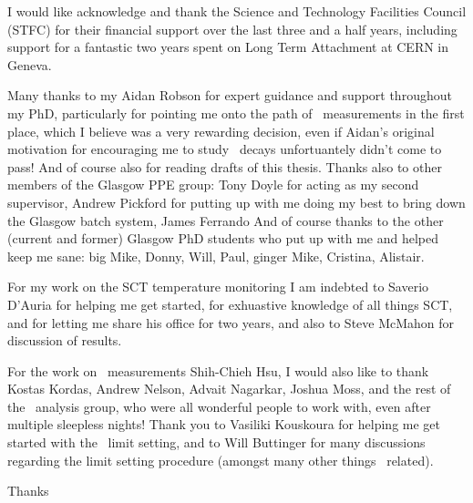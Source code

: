 I would like acknowledge and thank the Science and Technology Facilities Council
(STFC) for their financial support over the last three and a half years,
including support for a fantastic two years spent on Long Term Attachment at CERN
in Geneva.

Many thanks to my Aidan Robson for expert guidance and support throughout my
PhD, particularly for pointing me onto the path of \ZZ\ measurements in the first
place, which I believe was a very rewarding decision, even if Aidan's original
motivation for encouraging me to study \ZZ\ decays unfortuantely didn't come to
pass! And of course also for reading drafts of this thesis. Thanks also to other
members of the Glasgow PPE group: Tony Doyle for acting as my second supervisor,
Andrew Pickford for putting up with me doing my best to bring down the Glasgow
batch system, James Ferrando
And of course thanks to the other (current and former) Glasgow PhD students who put up with me and
helped keep me sane: big Mike, Donny, Will, Paul, ginger Mike, Cristina,
Alistair.

For my work on the SCT temperature monitoring I am indebted to Saverio D'Auria
for helping me get started, for exhuastive knowledge of all things SCT, and for
letting me share his office for two years, and also to Steve McMahon for
discussion of results.

For the work on \ZZ\ measurements Shih-Chieh Hsu, I would also like to thank
Kostas Kordas, Andrew Nelson, Advait Nagarkar, Joshua Moss, and the rest of the
\ZZ\ analysis group, who were all wonderful people to work with, even after
multiple sleepless nights! Thank you to Vasiliki Kouskoura for helping me get
started with the \TGC\ limit setting, and to Will Buttinger for many discussions
regarding the limit setting procedure (amongst many other things \ZZ\ related).

Thanks
